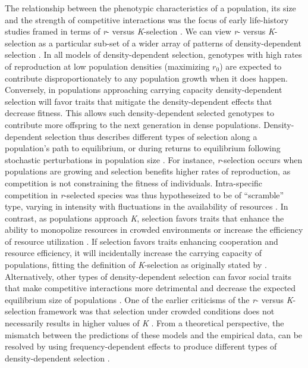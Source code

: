 \documentclass{article}
\begin{document}
 The relationship between the phenotypic characteristics of a population, its size and the strength of competitive interactions was the focus of early life-history studies framed in terms of \textit{r}- versus \textit{K}-selection \citep{macarthur1967theory}. We can view \textit{r}- versus \textit{K}-selection as a particular sub-set of a wider array of patterns of density-dependent selection \citep{Wright2018, Engen2020}. In all models of density-dependent selection, genotypes with high rates of reproduction at low population densities (maximizing $r_0$) are expected to contribute disproportionately to any population growth when it does happen. Conversely, in populations approaching carrying capacity density-dependent selection will favor traits that mitigate the density-dependent effects that decrease fitness. This allows such density-dependent selected genotypes to contribute more offspring to the next generation in dense populations. Density-dependent selection thus describes different types of selection along a population's path to equilibrium, or during returns to equilibrium following stochastic perturbations in population size \citep{Engen2013}. For instance, \textit{r}-selection occurs when populations are growing and selection benefits higher rates of reproduction, as competition is not constraining the fitness of individuals. Intra-specific competition in \textit{r}-selected species was thus hypotheseized to be of “scramble” type, varying in intensity with fluctuations in the availability of resources \citep{Southwood1977}. In contrast, as populations approach \textit{K}, selection favors traits that enhance the ability to monopolize resources in crowded environments or increase the efficiency of resource utilization \citep{Boyce1984}. If selection favors traits enhancing cooperation and resource efficiency, it will incidentally increase the carrying capacity of populations, fitting the definition of \textit{K}-selection as originally stated by \cite{macarthur1967theory}. Alternatively, other types of density-dependent selection can favor social traits that make competitive interactions more detrimental and decrease the expected equilibrium size of populations \citep{Joshi2001, Engen2020}. One of the earlier criticisms of the \textit{r}- versus \textit{K}-selection framework was that selection under crowded conditions does not necessarily results in higher values of \textit{K} \citep{Boyce1984}. From a theoretical perspective, the mismatch between the predictions of these models and the empirical data, can be resolved by using frequency-dependent effects to produce different types of density-dependent selection \citep{Engen2020}. 
\end{document}
